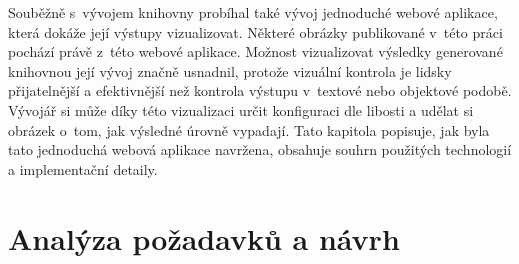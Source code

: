 
Souběžně s~vývojem knihovny probíhal také vývoj jednoduché webové aplikace, která dokáže její výstupy vizualizovat.
Některé obrázky publikované v~této práci pochází právě z~této webové aplikace.
Možnost vizualizovat výsledky generované knihovnou její vývoj značně usnadnil, protože vizuální kontrola je lidsky přijatelnější a efektivnější než kontrola výstupu v~textové nebo objektové podobě.
Vývojář si může díky této vizualizaci určit konfiguraci dle libosti a udělat si obrázek o~tom, jak výsledné úrovně vypadají.
Tato kapitola popisuje, jak byla tato jednoduchá webová aplikace navržena, obsahuje souhrn použitých technologií a implementační detaily.


\section{Analýza požadavků a návrh}
\label{sec:web_navrh}


